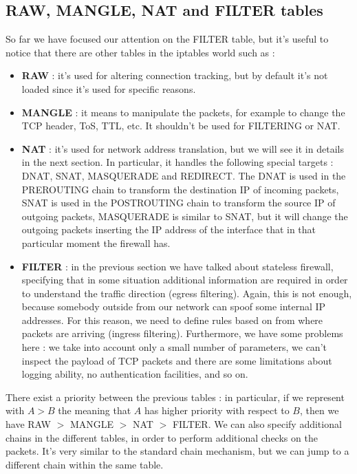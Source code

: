 \documentclass[11pt]{article}
\begin{document}
\subsection{RAW, MANGLE, NAT and FILTER tables}
So far we have focused our attention on the FILTER table, but it's useful to notice that there are other tables in the iptables world such as :
\begin{itemize}
\item \textbf{RAW} : it's used for altering connection tracking, but by default it's not loaded since it's used for specific reasons.
\item \textbf{MANGLE} : it means to manipulate the packets, for example to change the TCP header, ToS, TTL, etc. It shouldn't be used for FILTERING or NAT.
\item \textbf{NAT} : it's used for network address translation, but we will see it in details in the next section. In particular, it handles the following special targets : DNAT, SNAT, MASQUERADE and REDIRECT. The DNAT is used in the PREROUTING chain to transform the destination IP of incoming packets, SNAT is used in the POSTROUTING chain to transform the source IP of outgoing packets, MASQUERADE is similar to SNAT, but it will change the outgoing packets inserting the IP address of the interface that in that particular moment the firewall has.
\item \textbf{FILTER} : in the previous section we have talked about stateless firewall, specifying that in some situation additional information are required in order to understand the traffic direction (egress filtering). Again, this is not enough, because somebody outside from our network can spoof some internal IP addresses. For this reason, we need to define rules based on from where packets are arriving (ingress filtering). Furthermore, we have some problems here :  we take into account only a small number of parameters, we can't inspect the payload of TCP packets and there are some limitations about logging ability, no authentication facilities, and so on.
\end{itemize}
There exist a priority between the previous tables : in particular, if we represent with $A > B$ the meaning that $A$ has higher priority with respect to $B$, then we have RAW $>$ MANGLE $>$ NAT $>$ FILTER. We can also specify additional chains in the different tables, in order to perform additional checks on the packets. It's very similar to the standard chain mechanism, but we can jump to a different chain within the same table.
\end{document}
